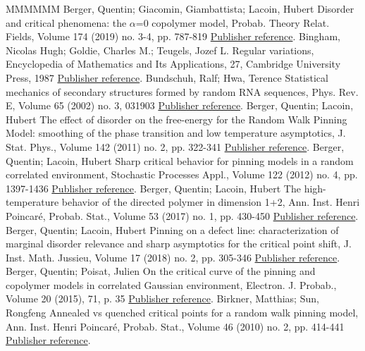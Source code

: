 \documentclass[11pt]{article}
\theoremstyle{definition}
\numberwithin{equation}{section}
\numberwithin{figure}{section}
\numberwithin{table}{section}
\begin{document}
\begin{thebibliography}{MMMMMM}
 Berger, Quentin; Giacomin, Giambattista; Lacoin, Hubert Disorder and critical phenomena: the \(\alpha\)=0 copolymer model, Probab. Theory Relat. Fields, Volume 174 (2019) no. 3-4, pp. 787-819 \href{https://ahl.centre-mersenne.org/item/AHL_2020__3__299_0/#cf:BGL}{Publisher reference}.
 Bingham, Nicolas Hugh; Goldie, Charles M.; Teugels, Jozef L. Regular variations, Encyclopedia of Mathematics and Its Applications, 27, Cambridge University Press, 1987 \href{https://ahl.centre-mersenne.org/item/AHL_2020__3__299_0/#cf:BGT}{Publisher reference}.
 Bundschuh, Ralf; Hwa, Terence Statistical mechanics of secondary structures formed by random RNA sequences, Phys. Rev. E, Volume 65 (2002) no. 3, 031903 \href{https://ahl.centre-mersenne.org/item/AHL_2020__3__299_0/#cf:BundHwa}{Publisher reference}.
 Berger, Quentin; Lacoin, Hubert The effect of disorder on the free-energy for the Random Walk Pinning Model: smoothing of the phase transition and low temperature asymptotics, J. Stat. Phys., Volume 142 (2011) no. 2, pp. 322-341 \href{https://ahl.centre-mersenne.org/item/AHL_2020__3__299_0/#cf:BL11}{Publisher reference}.
 Berger, Quentin; Lacoin, Hubert Sharp critical behavior for pinning models in a random correlated environment, Stochastic Processes Appl., Volume 122 (2012) no. 4, pp. 1397-1436 \href{https://ahl.centre-mersenne.org/item/AHL_2020__3__299_0/#cf:BL12}{Publisher reference}.
 Berger, Quentin; Lacoin, Hubert The high-temperature behavior of the directed polymer in dimension 1+2, Ann. Inst. Henri Poincaré, Probab. Stat., Volume 53 (2017) no. 1, pp. 430-450 \href{https://ahl.centre-mersenne.org/item/AHL_2020__3__299_0/#cf:BL16bis}{Publisher reference}.
 Berger, Quentin; Lacoin, Hubert Pinning on a defect line: characterization of marginal disorder relevance and sharp asymptotics for the critical point shift, J. Inst. Math. Jussieu, Volume 17 (2018) no. 2, pp. 305-346 \href{https://ahl.centre-mersenne.org/item/AHL_2020__3__299_0/#cf:BL16}{Publisher reference}.
 Berger, Quentin; Poisat, Julien On the critical curve of the pinning and copolymer models in correlated Gaussian environment, Electron. J. Probab., Volume 20 (2015), 71, p. 35 \href{https://ahl.centre-mersenne.org/item/AHL_2020__3__299_0/#cf:BP15}{Publisher reference}.
 Birkner, Matthias; Sun, Rongfeng Annealed vs quenched critical points for a random walk pinning model, Ann. Inst. Henri Poincaré, Probab. Stat., Volume 46 (2010) no. 2, pp. 414-441 \href{https://ahl.centre-mersenne.org/item/AHL_2020__3__299_0/#cf:BS1}{Publisher reference}.

\end{thebibliography}
\end{document}
